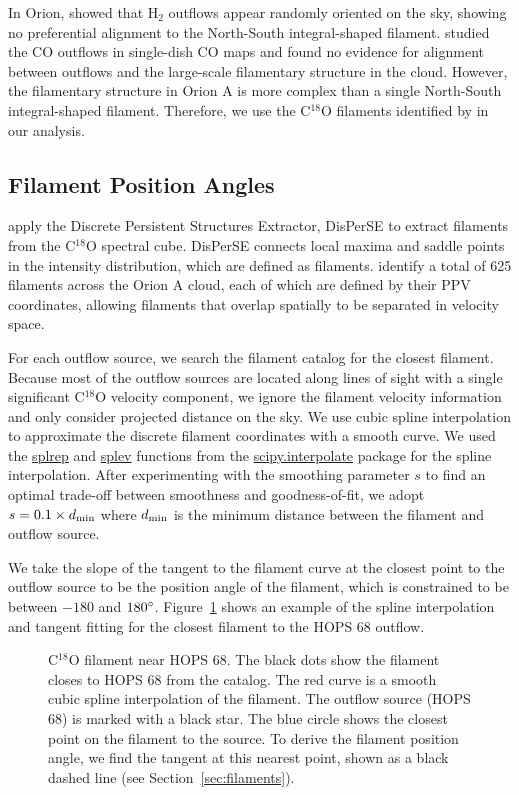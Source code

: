 \documentclass[twocolumn]{aastex63}
\newcommand{\example}{HOPS 68}
\begin{document}
In Orion, \citet{Davis09} showed that H$_{2}$ outflows appear randomly oriented on the sky, showing no preferential alignment to the North-South integral-shaped filament. \citet{Tanabe:submitted} studied the CO outflows in single-dish CO maps and found no evidence for alignment between outflows and the large-scale filamentary structure in the cloud. However, the filamentary structure in Orion A is more complex than a single North-South integral-shaped filament. Therefore, we use the C$^{18}$O filaments identified by \citet{Suri19} in our analysis.

\subsection{Filament Position Angles}
\citet{Suri19} apply the Discrete Persistent Structures Extractor, DisPerSE \citep{Sousbie11} to extract filaments from the C$^{18}$O spectral cube. DisPerSE connects local maxima and saddle points in the intensity distribution, which are defined as filaments. \citet{Suri19} identify a total of 625 filaments across the Orion A cloud, each of which are defined by their PPV coordinates, allowing filaments that overlap spatially to be separated in velocity space. 

For each outflow source, we search the filament catalog for the closest filament. Because most of the outflow sources are located along lines of sight with a single significant C$^{18}$O velocity component, we ignore the filament velocity information and only consider projected distance on the sky. We use cubic spline interpolation to approximate the discrete filament coordinates with a smooth curve. We used the \url{splrep} and \url{splev} functions from the \url{scipy.interpolate} package for the spline interpolation. After experimenting with the smoothing parameter $s$ to find an optimal trade-off between smoothness and goodness-of-fit, we adopt $s = 0.1\times d_{\rm min}$ where $d_{\rm min}$ is the minimum distance between the filament and outflow source.

We take the slope of the tangent to the filament curve at the closest point to the outflow source to be the position angle of the filament, which is constrained to be between $-180$ and $180\mbox{$^\circ$}$. Figure~\ref{fig:filament} shows an example of the spline interpolation and tangent fitting for the closest filament to the \example{} outflow.

\begin{figure}
\caption{C$^{18}$O filament near \example{}. The black dots show the filament closes to \example{} from the \citet{Suri19} catalog. The red curve is a smooth cubic spline interpolation of the filament. The outflow source (\example{}) is marked with a black star. The blue circle shows the closest point on the filament to the source. To derive the filament position angle, we find the tangent at this nearest point, shown as a black dashed line (see Section~\ref{sec:filaments}).\label{fig:filament}}
\end{figure}
\end{document}
